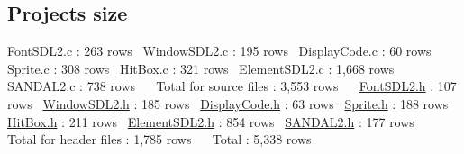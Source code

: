 \subsection*{Project\textquotesingle{}s size}

Font\+S\+D\+L2.\+c \+: 263 rows~\newline
 Window\+S\+D\+L2.\+c \+: 195 rows~\newline
 Display\+Code.\+c \+: 60 rows~\newline
 Sprite.\+c \+: 308 rows~\newline
 Hit\+Box.\+c \+: 321 rows~\newline
 Element\+S\+D\+L2.\+c \+: 1,668 rows~\newline
 S\+A\+N\+D\+A\+L2.\+c \+: 738 rows~\newline
 ~\newline
 Total for source files \+: 3,553 rows~\newline
 ~\newline
 \hyperlink{FontSDL2_8h}{Font\+S\+D\+L2.\+h} \+: 107 rows~\newline
 \hyperlink{WindowSDL2_8h}{Window\+S\+D\+L2.\+h} \+: 185 rows~\newline
 \hyperlink{DisplayCode_8h}{Display\+Code.\+h} \+: 63 rows~\newline
 \hyperlink{Sprite_8h}{Sprite.\+h} \+: 188 rows~\newline
 \hyperlink{HitBox_8h}{Hit\+Box.\+h} \+: 211 rows~\newline
 \hyperlink{ElementSDL2_8h}{Element\+S\+D\+L2.\+h} \+: 854 rows~\newline
 \hyperlink{SANDAL2_8h}{S\+A\+N\+D\+A\+L2.\+h} \+: 177 rows~\newline
 ~\newline
 Total for header files \+: 1,785 rows~\newline
 ~\newline
 Total \+: 5,338 rows 